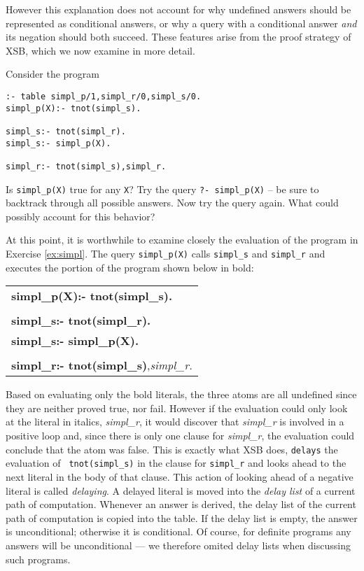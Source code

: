 However this explanation does not account for why undefined answers
should be represented as conditional answers, or why a query with a
conditional answer {\em and} its negation should both succeed.  These
features arise from the proof strategy of XSB, which we now examine in
more detail.

\begin{exercise} \label{ex:simpl}
Consider the program
\begin{verbatim}
:- table simpl_p/1,simpl_r/0,simpl_s/0.
simpl_p(X):- tnot(simpl_s).

simpl_s:- tnot(simpl_r).
simpl_s:- simpl_p(X).

simpl_r:- tnot(simpl_s),simpl_r.
\end{verbatim}
Is {\tt simpl\_p(X)} true for any {\tt X}?  Try the query {\tt ?-
simpl\_p(X)} -- be sure to backtrack through all possible answers.
Now try the query again.  What could possibly account for this
behavior?
\end{exercise}

At this point, it is worthwhile to examine closely the evaluation of
the program in Exercise \ref{ex:simpl}.  The query {\tt simpl\_p(X)}
calls {\tt simpl\_s} and {\tt simpl\_r} and executes the portion of
the program shown below in bold:
\begin{center}
\begin{tabular}{l}
{\bf simpl\_p(X):- tnot(simpl\_s).} \\
\\
{\bf simpl\_s:- tnot(simpl\_r).} \\
{\bf simpl\_s:- simpl\_p(X).} \\
\\
{\bf simpl\_r:- tnot(simpl\_s)},{\it simpl\_r.}
\end{tabular}
\end{center}
Based on evaluating only the bold literals, the three atoms are all
undefined since they are neither proved true, nor fail.  However if
the evaluation could only look at the literal in italics, {\em
simpl\_r}, it would discover that {\em simpl\_r} is involved in a
positive loop and, since there is only one clause for {\em simpl\_r},
the evaluation could conclude that the atom was false.  This is
exactly what XSB does, {\tt delays} the evaluation of {\tt
tnot(simpl\_s)} in the clause for {\tt simpl\_r} and looks ahead to
the next literal in the body of that clause.  This action of looking
ahead of a negative literal is called {\em delaying}.  A delayed
literal is moved into the {\em delay list} of a current path of
computation.  Whenever an answer is derived, the delay list of the
current path of computation is copied into the table.  If the delay
list is empty, the answer is unconditional; otherwise it is
conditional.  Of course, for definite programs any answers will be
unconditional --- we therefore omited delay lists when discussing such
programs.

